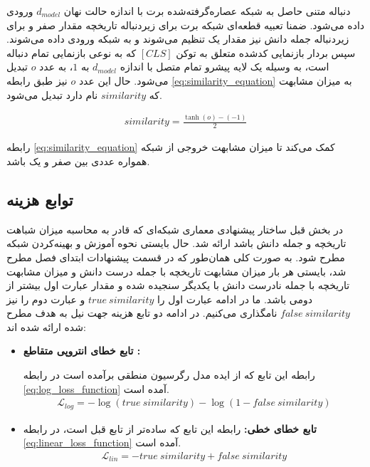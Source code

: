 دنباله متنی حاصل به شبکه عصاره‌گرفته‌شده برت 
با اندازه حالت نهان 
$d_{model}$
ورودی داده می‌شود.
ضمنا تعبیه قطعه‌ای شبکه برت برای زیردنباله تاریخچه مقدار صفر و برای زیردنباله جمله دانش نیز مقدار یک تنظیم می‌شوند و به شبکه ورودی داده می‌شوند. 
 سپس بردار بازنمایی کدشده متعلق به توکن
$[CLS] $
که به نوعی بازنمایی تمام دنباله است،‌ به وسیله 
یک لایه پیشرو تمام متصل با اندازه
$d_{model}$
به 
$1$،
 به عدد 
 $o$
  تبدیل می‌شود. حال این عدد $o$ نیز طبق رابطه 
  \ref{eq:similarity_equation}
   به میزان مشابهت که $similarity$ نام دارد تبدیل می‌شود. 
  
  \begin{gather}\label{eq:similarity_equation}
  similarity = \frac{\tanh{(o)}-(-1)}{2}
  \end{gather}

رابطه 
\ref{eq:similarity_equation}
کمک می‌کند تا میزان مشابهت خروجی از شبکه همواره عددی بین صفر و یک باشد. 

\subsection{توابع هزینه}
در بخش قبل ساختار پیشنهادی معماری شبکه‌ای که قادر به محاسبه میزان شباهت تاریخچه و جمله دانش باشد ارائه شد. حال بایستی نحوه آموزش و بهینه‌کردن شبکه مطرح شود. به صورت کلی همان‌طور که در قسمت پیشنهادات ابتدای فصل مطرح شد، بایستی هر بار میزان مشابهت تاریخچه با جمله درست دانش و میزان مشابهت تاریخچه با جمله نادرست دانش با یکدیگر سنجیده شده و مقدار عبارت اول بیشتر از دومی باشد. ما در ادامه عبارت اول را 
$true\:similarity$
و عبارت دوم را نیز
$false\:similarity$
نامگذاری می‌کنیم. در ادامه دو تابع هزینه جهت نیل به هدف مطرح شده ارائه شده اند:

\begin{itemize}
	\item 
	\textbf{
	تابع خطای انتروپی متقاطع 
	:
	}

	رابطه این تابع که از ایده مدل رگرسیون منطقی برآمده است در رابطه
	\ref{eq:log_loss_function}
	آمده است. 
\begin{gather}\label{eq:log_loss_function}
\mathcal{L}_{log} = -\log{(true\:similarity)} -  \log{(1-false\:similarity)} 
\end{gather}


	\item
	\textbf{
	تابع خطای خطی:
	}
رابطه این تابع که ساده‌تر از تابع قبل است، در رابطه 
\ref{eq:linear_loss_function}
آمده است.
\begin{gather}\label{eq:linear_loss_function}
\mathcal{L}_{lin} = -true\:similarity + false\:similarity 
\end{gather}


\end{itemize}

